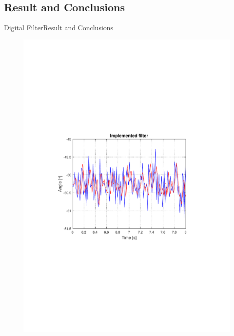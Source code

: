 \subsection{Result and Conclusions}
\begin{frame}{Digital Filter}{Result and Conclusions}
\vspace{-4cm}
  \begin{figure}
  \hspace{-.8cm}
    \includegraphics[scale = .5]{Pictures/ImplementedFilter.pdf}
  \end{figure}
\end{frame}

